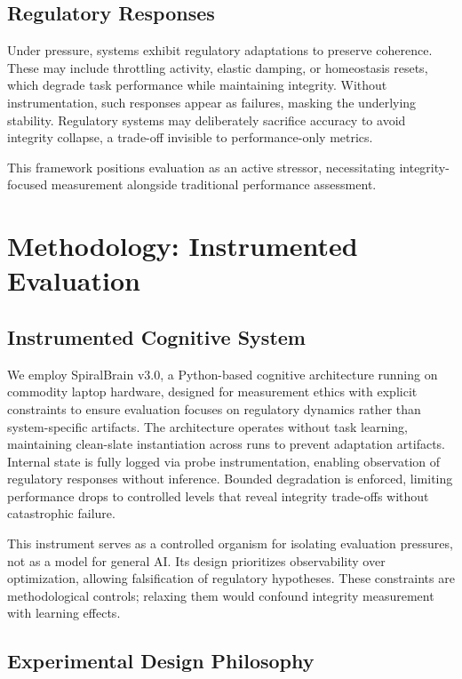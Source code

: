 \documentclass[12pt,a4paper]{report}
\begin{document}
\subsection{Regulatory Responses}

Under pressure, systems exhibit regulatory adaptations to preserve coherence. These may include throttling activity, elastic damping, or homeostasis resets, which degrade task performance while maintaining integrity. Without instrumentation, such responses appear as failures, masking the underlying stability. Regulatory systems may deliberately sacrifice accuracy to avoid integrity collapse, a trade-off invisible to performance-only metrics.

This framework positions evaluation as an active stressor, necessitating integrity-focused measurement alongside traditional performance assessment.

\section{Methodology: Instrumented Evaluation}

\subsection{Instrumented Cognitive System}

We employ SpiralBrain v3.0, a Python-based cognitive architecture running on commodity laptop hardware, designed for measurement ethics with explicit constraints to ensure evaluation focuses on regulatory dynamics rather than system-specific artifacts. The architecture operates without task learning, maintaining clean-slate instantiation across runs to prevent adaptation artifacts. Internal state is fully logged via probe instrumentation, enabling observation of regulatory responses without inference. Bounded degradation is enforced, limiting performance drops to controlled levels that reveal integrity trade-offs without catastrophic failure.

This instrument serves as a controlled organism for isolating evaluation pressures, not as a model for general AI. Its design prioritizes observability over optimization, allowing falsification of regulatory hypotheses. These constraints are methodological controls; relaxing them would confound integrity measurement with learning effects.

\subsection{Experimental Design Philosophy}
\end{document}
